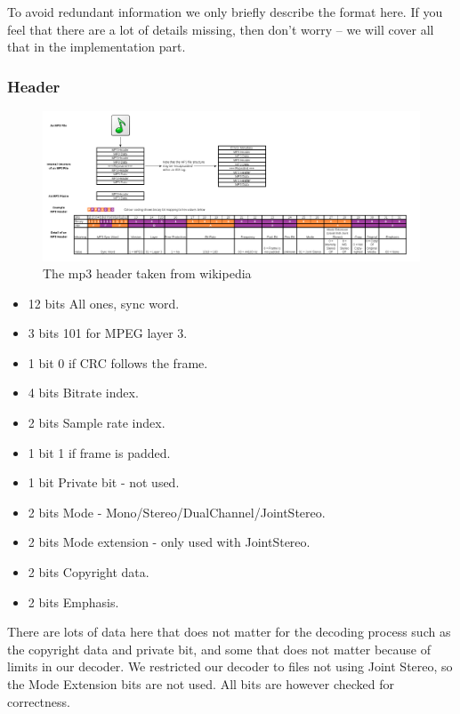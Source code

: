 \documentclass[a4paper,12pt]{article}
\begin{document}
       To avoid redundant information we only briefly describe the format here.
       If you feel that there are a lot of details missing, then don't worry --
       we will cover all that in the implementation part.

       \subsubsection{Header}
       \label{sec:header}
\begin{figure}[h!]
  \centering
    \includegraphics[width=1.1\textwidth]{1000px-Mp3filestructure}
  \caption{The mp3 header taken from wikipedia \cite{mike}}
\end{figure}
            \begin{itemize}
                \item{12 bits} All ones, sync word.
                \item{3 bits} 101 for MPEG layer 3.
                \item{1 bit} 0 if CRC follows the frame.
                \item{4 bits} Bitrate index.
                \item{2 bits} Sample rate index.
                \item{1 bit} 1 if frame is padded.
                \item{1 bit} Private bit - not used.
                \item{2 bits} Mode - Mono/Stereo/DualChannel/JointStereo.
                \item{2 bits} Mode extension - only used with JointStereo.
                \item{2 bits} Copyright data.
                \item{2 bits} Emphasis.
            \end{itemize}

            There are lots of data here that does not matter for the decoding
            process such as the copyright data and private bit, and
            some that does not matter because of limits in our
            decoder. We restricted our decoder to files not using Joint Stereo,
            so the Mode Extension bits are not used. All bits are however
            checked for correctness.
\end{document}

